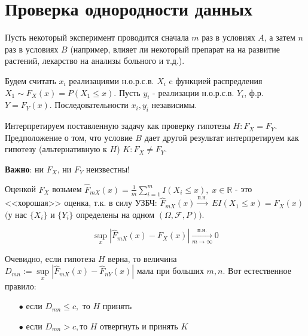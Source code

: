 \section{Проверка однородности данных}\label{cha:2/sec:2}
\begin{example}
	Пусть некоторый эксперимент проводится сначала $ m$ раз в условиях $A$, а затем $ n$ раз в условиях $ B$ (например, влияет ли некоторый препарат на на развитие растений, лекарство на анализы больного и т.д.).

	\noindent Будем считать $ {x_i}$ реализациями н.о.р.с.в. $ {X_i} $ c функцией распредления $ X_1 \sim F_X(x) = P(X_1 \leq x).$ Пусть $ {y_i}$ - реализации н.о.р.с.в. $ {Y_i}$, ф.р. $ Y = F_Y(x).$ Последовательности $ {x_i}, {y_i}$ независимы.

	\noindent Интерпретируем поставленную задачу как проверку гипотезы $\displaystyle H: F_X = F_Y$.
	Предположение о том, что условие $B$ дает другой результат интерпретируем как гипотезу (альтернативную к $ H$)
	$\displaystyle K: F_X \neq F_Y$.

	\textbf{Важно}: ни $ F_X$, ни $ F_Y$ неизвестны!

	\noindent Оценкой $ F_X$ возьмем $\displaystyle \hat{F}_{mX}(x) = \frac{1}{m}\sum\limits_{i=1}^{m}I(X_i \leq x), \; x \in \mathbb{R}$ - это <<хорошая>> оценка, т.к. в силу УЗБЧ: $\displaystyle \hat{F}_{mX}(x) \xrightarrow{\text{п.н.}}\; EI(X_1 \leq x) = F_X(x)$ $($у нас $ \{X_i\}$ и $ \{Y_i\}$ определены на одном $ (\Omega, \mathcal{F}, P)$$)$.

	\begin{theorem}
		\[ \sup\limits_x|\hat{F}_{mX}(x) - F_X(x)| \xrightarrow[m \to \infty]{\text{п.н.}}
		0\]
	\end{theorem}

	Очевидно, если гипотеза $ H$ верна, то величина $\displaystyle D_{mn} := \sup\limits_x|\hat{F}_{mX}(x) -\hat{F}_{nY}(x)|$ мала при больших $ m,n.$
	Вот естественное правило:
	\begin{itemize}
		\item[$\bullet$] $\text{если } D_{mn}\leq c, \text{ то } H \text{ принять }$
		\item[$\bullet$] $\text{если } D_{mn}> c, \text{то } H \text{ отвергнуть и принять } K$
	\end{itemize}


\end{example}
